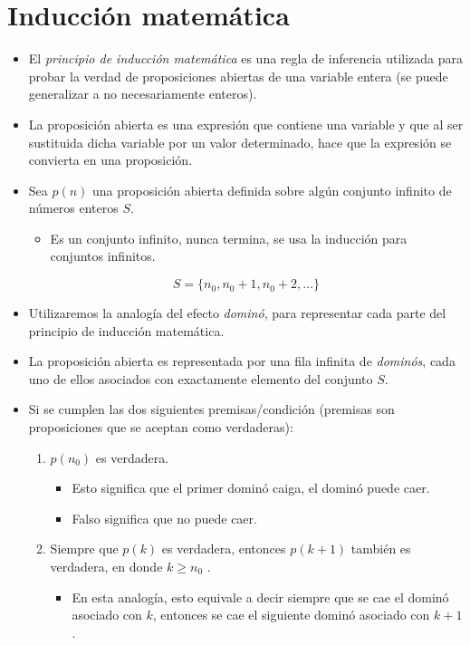 \section{Inducción matemática}
\begin{itemize}
    \item El \emph{principio de inducción matemática} es una regla de inferencia utilizada para probar la verdad de proposiciones abiertas de una variable entera (se puede generalizar a no necesariamente enteros).
    \item La proposición abierta es una expresión que contiene una variable y que al ser sustituida dicha variable por un valor determinado, hace que la expresión se convierta en una proposición. 
    \item Sea $p(n)$ una proposición abierta definida sobre algún conjunto infinito de números enteros $S$.
        \begin{itemize}
            \item Es un conjunto infinito, nunca termina, se usa la inducción para conjuntos infinitos.
        \end{itemize}
        \[
          S = \{n_0,n_0+1,n_0+2,\dots\} 
        \]
    
    \item Utilizaremos la analogía del efecto \emph{dominó}, para representar cada parte del principio de inducción matemática.
    \item La proposición abierta es representada por una fila infinita de \emph{dominós}, cada uno de ellos asociados con exactamente elemento del conjunto $S$. 
    \item Si se cumplen las dos siguientes premisas/condición (premisas son proposiciones que se aceptan como verdaderas): 
        \begin{enumerate}
            \item $p(n_0)$ es verdadera.
                \begin{itemize}
                    \item Esto significa que el primer dominó caiga, el dominó puede caer.
                    \item Falso significa que no puede caer. 
                \end{itemize}

            \item Siempre que $p(k)$ es verdadera, entonces $p(k+1)$ también es verdadera, en donde $k \geq n_0$ .
                \begin{itemize}
                    \item En esta analogía, esto equivale a decir siempre que se cae el dominó asociado con $k$, entonces se cae el siguiente dominó asociado con $k+1$.
                \end{itemize}
            

\end{enumerate}
\end{itemize}
